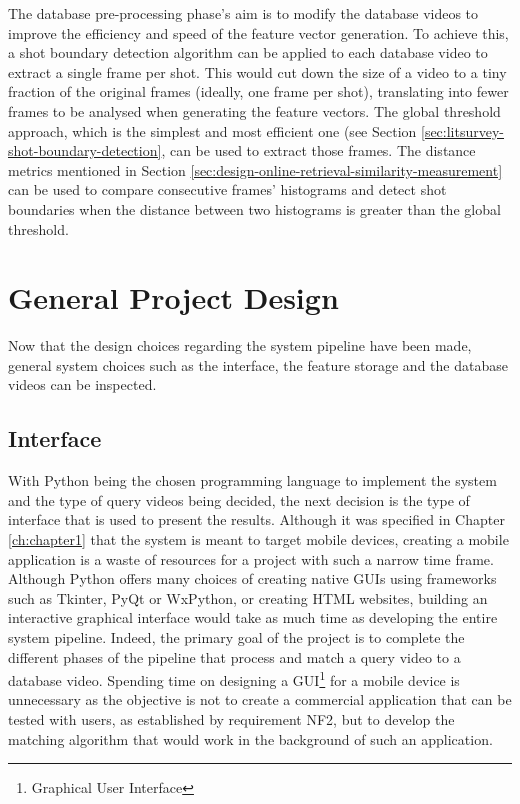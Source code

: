 The database pre-processing phase's aim is to modify the database videos to improve the efficiency and speed of the feature vector generation. To achieve this, a shot boundary detection algorithm can be applied to each database video to extract a single frame per shot. This would cut down the size of a video to a tiny fraction of the original frames (ideally, one frame per shot), translating into fewer frames to be analysed when generating the feature vectors. The global threshold approach, which is the simplest and most efficient one (see Section \ref{sec:litsurvey-shot-boundary-detection}, can be used to extract those frames. The distance metrics mentioned in Section \ref{sec:design-online-retrieval-similarity-measurement} can be used to compare consecutive frames' histograms and detect shot boundaries when the distance between two histograms is greater than the global threshold.


\section{General Project Design}

Now that the design choices regarding the system pipeline have been made, general system choices such as the interface, the feature storage and the database videos can be inspected.


\subsection{Interface}

With Python being the chosen programming language to implement the system and the type of query videos being decided, the next decision is the type of interface that is used to present the results. Although it was specified in Chapter \ref{ch:chapter1} that the system is meant to target mobile devices, creating a mobile application is a waste of resources for a project with such a narrow time frame. Although Python offers many choices of creating native GUIs using frameworks such as Tkinter, PyQt or WxPython, or creating HTML websites, building an interactive graphical interface would take as much time as developing the entire system pipeline. Indeed, the primary goal of the project is to complete the different phases of the pipeline that process and match a query video to a database video. Spending time on designing a GUI\footnote{Graphical User Interface} for a mobile device is unnecessary as the objective is not to create a commercial application that can be tested with users, as established by requirement NF2, but to develop the matching algorithm that would work in the background of such an application.\\

